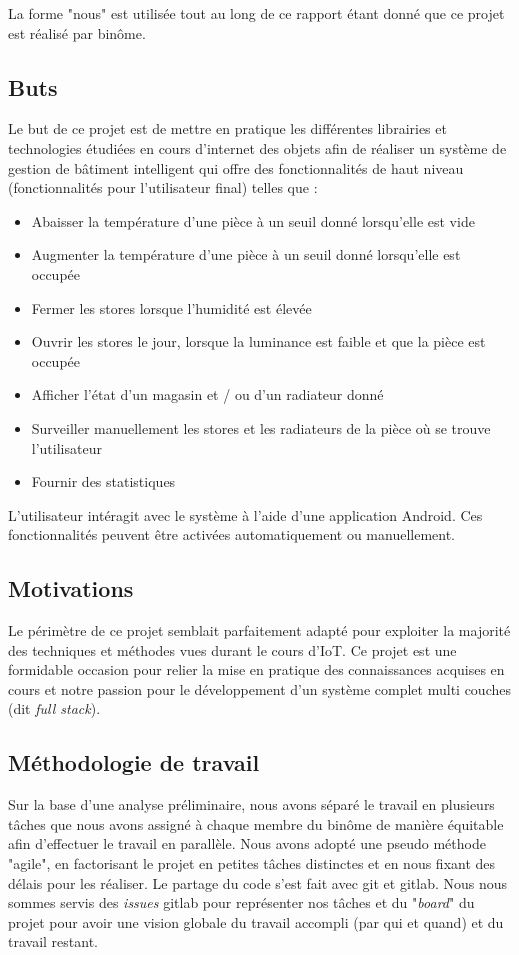 La forme "nous" est utilisée tout au long de ce rapport étant donné que ce projet est réalisé par binôme.

\subsection{Buts}
Le but de ce projet est de mettre en pratique les différentes librairies et technologies étudiées en cours d'internet des objets afin de réaliser un système de gestion de bâtiment intelligent qui offre des fonctionnalités de haut niveau (fonctionnalités pour l'utilisateur final) telles que :
\begin{itemize}
    \item Abaisser la température d'une pièce à un seuil donné lorsqu'elle est vide
    \item Augmenter la température d'une pièce à un seuil donné lorsqu'elle est occupée
    \item Fermer les stores lorsque l'humidité est élevée
    \item Ouvrir les stores le jour, lorsque la luminance est faible et que la pièce est occupée
    \item Afficher l'état d'un magasin et / ou d'un radiateur donné
    \item Surveiller manuellement les stores et les radiateurs de la pièce où se trouve l'utilisateur
    \item Fournir des statistiques
\end{itemize}
L'utilisateur intéragit avec le système à l'aide d'une application Android. Ces fonctionnalités peuvent être activées automatiquement ou manuellement.

\subsection{Motivations}
Le périmètre de ce projet semblait parfaitement adapté pour exploiter la majorité des techniques et méthodes vues durant le cours d'IoT. Ce projet est une formidable occasion pour relier la mise en pratique des connaissances acquises en cours et notre passion pour le développement d'un système complet multi couches (dit \textit{full stack}).

\subsection{Méthodologie de travail}
Sur la base d'une analyse préliminaire, nous avons séparé le travail en plusieurs tâches que nous avons assigné à chaque membre du binôme de manière équitable afin d'effectuer le travail en parallèle.
Nous avons adopté une pseudo méthode "agile", en factorisant le projet en petites tâches distinctes et en nous fixant des délais pour les réaliser. Le partage du code s'est fait avec git et gitlab. Nous nous sommes servis des \textit{issues} gitlab pour représenter nos tâches et du "\textit{board}" du projet pour avoir une vision globale du travail accompli (par qui et quand) et du travail restant.

\cite{tmdb} \cite{book}